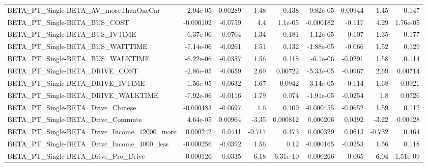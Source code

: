 \begin{tabular}{lrrrrrrrr}
BETA\_PT\_Single-BETA\_AV\_moreThanOneCar              &    2.94e-05 &      0.00289 &     -1.48 &    0.138 &   9.82e-05 &     0.00944 &        -1.45 &         0.147 \\
BETA\_PT\_Single-BETA\_BUS\_COST                       &   -0.000102 &      -0.0759 &       4.4 &  1.1e-05 &  -0.000182 &      -0.117 &         4.29 &      1.76e-05 \\
BETA\_PT\_Single-BETA\_BUS\_IVTIME                     &   -6.37e-06 &      -0.0704 &      1.34 &    0.181 &  -1.12e-05 &      -0.107 &         1.35 &         0.177 \\
BETA\_PT\_Single-BETA\_BUS\_WAITTIME                   &   -7.14e-06 &      -0.0261 &      1.51 &    0.132 &  -1.88e-05 &      -0.066 &         1.52 &         0.129 \\
BETA\_PT\_Single-BETA\_BUS\_WALKTIME                   &   -6.22e-06 &      -0.0357 &      1.56 &    0.118 &   -6.1e-06 &     -0.0291 &         1.58 &         0.114 \\
BETA\_PT\_Single-BETA\_DRIVE\_COST                     &   -2.86e-05 &      -0.0659 &      2.69 &  0.00722 &  -5.33e-05 &     -0.0967 &         2.69 &       0.00714 \\
BETA\_PT\_Single-BETA\_DRIVE\_IVTIME                   &   -1.56e-05 &      -0.0632 &      1.67 &   0.0942 &  -3.14e-05 &      -0.114 &         1.68 &        0.0921 \\
BETA\_PT\_Single-BETA\_DRIVE\_WALKTIME                 &   -7.92e-06 &      -0.0116 &      1.79 &    0.074 &  -1.91e-05 &     -0.0254 &          1.8 &        0.0726 \\
BETA\_PT\_Single-BETA\_Drive\_Chinese                  &   -0.000483 &      -0.0697 &       1.6 &    0.109 &  -0.000455 &     -0.0652 &         1.59 &         0.112 \\
BETA\_PT\_Single-BETA\_Drive\_Commute                  &    4.64e-05 &      0.00964 &     -3.35 & 0.000812 &   0.000206 &      0.0392 &        -3.22 &       0.00128 \\
BETA\_PT\_Single-BETA\_Drive\_Income\_12000\_more        &    0.000242 &       0.0441 &    -0.717 &    0.473 &   0.000329 &      0.0613 &       -0.732 &         0.464 \\
BETA\_PT\_Single-BETA\_Drive\_Income\_4000\_less         &   -0.000256 &      -0.0392 &      1.56 &     0.12 &  -0.000165 &     -0.0253 &         1.56 &         0.118 \\
BETA\_PT\_Single-BETA\_Drive\_Pro\_Drive                &    0.000126 &       0.0335 &     -6.18 & 6.31e-10 &   0.000266 &       0.065 &        -6.04 &      1.51e-09 \\

\end{tabular}
